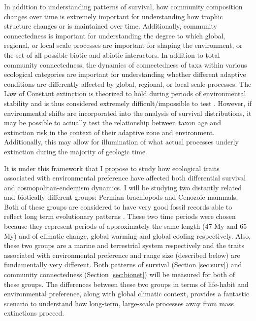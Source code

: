 \documentclass[12pt,letterpaper]{article}
\begin{document}
In addition to understanding patterns of survival, how community composition changes over time is extremely important for understanding how trophic structure changes or is maintained over time. Additionally, community connectedness is important for understanding the degree to which global, regional, or local scale processes are important for shaping the environment, or the set of all possible biotic and abiotic interactors. In addition to total community connectedness, the dynamics of connectedness of taxa within various ecological categories are important for understanding whether different adaptive conditions are differently affected by global, regional, or local scale processes. The Law of Constant extinction is theorized to hold during periods of environmental stability and is thus considered extremely difficult/impossible to test \citep{Liow2011a}. However, if environmental shifts are incorporated into the analysis of survival distributions, it may be possible to actually test the relationship between taxon age and extinction risk in the context of their adaptive zone and environment. Additionally, this may allow for illumination of what actual processes underly extinction during the majority of geologic time. 

It is under this framework that I propose to study how ecological traits associated with environmental preference have affected both differential survival and cosmopolitan-endemism dynamics. I will be studying two distantly related and biotically different groups: Permian brachiopods and Cenozoic mammals. Both of these groups are considered to have very good fossil records able to reflect long term evolutionary patterns \citep{Mark1977}. These two time periods were chosen because they represent periods of approximately the same length (47 My and 65 My) and of climatic change, global warming and global cooling respectively. Also, these two groups are a marine and terrestrial system respectively and the traits associated with environmental preference and range size (described below) are fundamentally very different. Both patterns of survival (Section \ref{sec:surv}) and community connectedness (Section \ref{sec:bionet}) will be measured for both of these groups. The differences between these two groups in terms of life-habit and environmental preference, along with global climatic context, provides a fantastic scenario to understand how long-term, large-scale processes away from mass extinctions proceed.
\end{document}
